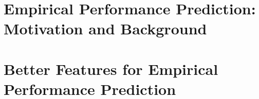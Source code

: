 \documentclass[ twoside,openright,titlepage,numbers=noenddot,headinclude,%
                footinclude=true,cleardoublepage=empty,abstract=false,
                BCOR=5mm,paper=a4,fontsize=11pt,%
                ngerman,american,%
                ]{scrreprt}
\begin{document}
\frenchspacing
\raggedbottom
\pagestyle{plain}



% 


\cleardoublepage
\cleardoublepage
\cleardoublepage
\pagestyle{scrheadings}
\cleardoublepage
\cleardoublepage{}
\cleardoublepage
\part{Empirical Performance Prediction: Motivation and Background}

\noindent





\cleardoublepage

\part{Better Features for Empirical Performance Prediction}

\end{document}
